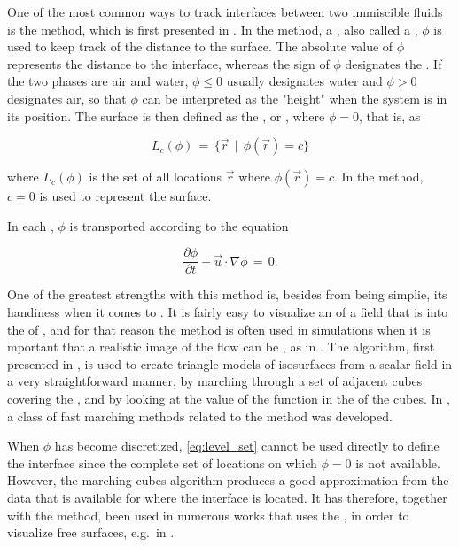 One of the most common ways to track interfaces between two immiscible fluids is the \LS method, which is first presented in \citep{Osher1988}. In the \LS method, a , also called a , $\phi$ is used to keep track of the distance to the surface. The absolute value of $\phi$ represents the distance to the interface, whereas the sign of $\phi$ designates the \phase. If the two phases are air and water, $\phi \leq 0$ usually designates water and $\phi > 0$ designates air, so that $\phi$ can be interpreted as the "height" when the system is in its \equilibrium position. The surface is then defined as the \isosurface, or , where $\phi = 0$, that is, as

\begin{equation} \label{eq:level_set}
L_c(\phi) \,=\, \{\vec{r} \,\mid\, \phi(\vec{r})=c\}
\end{equation}

where $L_c(\phi)$ is the set of all locations $\vec{r}$ where $\phi(\vec{r}) = c$. In the \LS method, $c = 0$ is used to represent the surface.

In each , $\phi$ is transported according to the equation

\begin{equation} \label{eq:level_set_function_transport}
\frac{\partial\phi}{\partial t} + \vec{u}\cdot\nabla\phi \,=\, 0.
\end{equation}

One of the greatest strengths with this method is, besides from being simplie, its handiness when it comes to . It is fairly easy to visualize an \isosurface of a field that is \discretized into the \nodes of , and for that reason the \LS method is often used in \FVM simulations when it is mportant that a realistic image of the flow can be \rendered, as in \citep{Losasso2004,Chentanez2011}. The  algorithm, first presented in \citep{Lorensen1987}, is used to create triangle models of isosurfaces from a scalar field in a very straightforward manner, by marching through a set of adjacent cubes covering the , and by looking at the value of the function in the  of the cubes. In \citep{Sethian1995}, a class of fast marching methods related to the \LS method was developed.

When $\phi$ has become discretized, \eqref{eq:level_set} cannot be used directly to define the interface since the complete set of locations on which $\phi = 0$ is not available. However, the marching cubes algorithm produces a good approximation from the data that is available for where the interface is located. It has therefore, together with the \LS method, been used in numerous works that uses the \FVM, in order to visualize free surfaces, e.g.\ in \citep{Losasso2004}.

